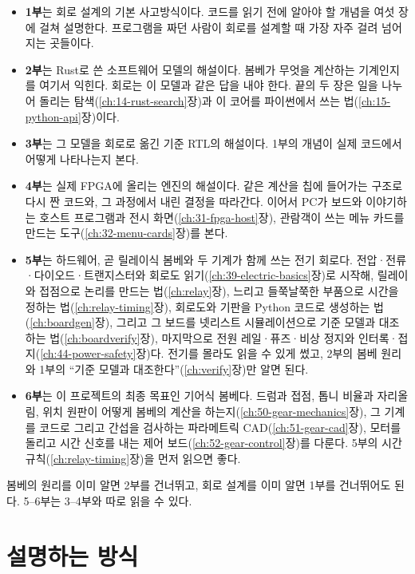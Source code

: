 \begin{itemize}
\item \textbf{1부}는 회로 설계의 기본 사고방식이다. 코드를 읽기 전에 알아야 할 개념을 여섯 장에 걸쳐
설명한다. 프로그램을 짜던 사람이 회로를 설계할 때 가장 자주 걸려 넘어지는 곳들이다.
\item \textbf{2부}는 Rust로 쓴 소프트웨어 모델의 해설이다. 봄베가 무엇을 계산하는 기계인지를 여기서
익힌다. 회로는 이 모델과 같은 답을 내야 한다. 끝의 두 장은 일을 나누어 돌리는 탐색(\ref{ch:14-rust-search}장)과
이 코어를 파이썬에서 쓰는 법(\ref{ch:15-python-api}장)이다.
\item \textbf{3부}는 그 모델을 회로로 옮긴 기준 RTL의 해설이다. 1부의 개념이 실제 코드에서 어떻게
나타나는지 본다.
\item \textbf{4부}는 실제 FPGA에 올리는 엔진의 해설이다. 같은 계산을 칩에 들어가는
구조로 다시 짠 코드와, 그 과정에서 내린 결정을 따라간다. 이어서 PC가 보드와 이야기하는 호스트 프로그램과
전시 화면(\ref{ch:31-fpga-host}장), 관람객이 쓰는 메뉴 카드를 만드는 도구(\ref{ch:32-menu-cards}장)를 본다.
\item \textbf{5부}는 하드웨어, 곧 릴레이식 봄베와 두 기계가 함께 쓰는 전기 회로다. 전압·전류·다이오드·트랜지스터와
회로도 읽기(\ref{ch:39-electric-basics}장)로 시작해, 릴레이와 접점으로 논리를
만드는 법(\ref{ch:relay}장), 느리고 들쭉날쭉한 부품으로 시간을 정하는 법(\ref{ch:relay-timing}장), 회로도와
기판을 Python 코드로 생성하는 법(\ref{ch:boardgen}장), 그리고 그 보드를 넷리스트 시뮬레이션으로 기준 모델과
대조하는 법(\ref{ch:boardverify}장), 마지막으로 전원 레일·퓨즈·비상 정지와 인터록·접지(\ref{ch:44-power-safety}장)다.
전기를 몰라도 읽을 수 있게 썼고, 2부의 봄베 원리와 1부의
``기준 모델과 대조한다''(\ref{ch:verify}장)만 알면 된다.
\item \textbf{6부}는 이 프로젝트의 최종 목표인 기어식 봄베다. 드럼과 접점, 톱니 비율과 자리올림, 위치 원판이 어떻게
봄베의 계산을 하는지(\ref{ch:50-gear-mechanics}장), 그 기계를 코드로 그리고 간섭을 검사하는
파라메트릭 CAD(\ref{ch:51-gear-cad}장), 모터를 돌리고 시간 신호를 내는 제어 보드(\ref{ch:52-gear-control}장)를 다룬다.
5부의 시간 규칙(\ref{ch:relay-timing}장)을 먼저 읽으면 좋다.
\end{itemize}

봄베의 원리를 이미 알면 2부를 건너뛰고, 회로 설계를 이미 알면 1부를 건너뛰어도 된다. 5--6부는 3--4부와 따로
읽을 수 있다.

\section{설명하는 방식}

